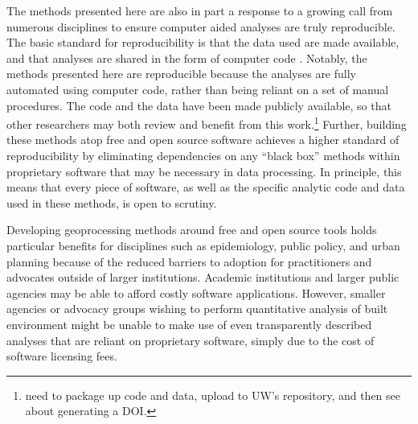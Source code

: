 \documentclass[11pt,letterpaper]{article} %
\begin{document}
The methods presented here are also in part a response to a growing
call from numerous disciplines to ensure computer aided
analyses are truly reproducible. The basic standard for reproducibility is
that the data used are made available, and that analyses are shared in the
form of computer code \parencite{Peng2011computational}. Notably, the
methods presented here are reproducible because the analyses are fully
automated using computer code, rather than being reliant on a set of
manual procedures. The code and the data have been made publicly
available, so that other researchers may both review and benefit from this work.\footnote{need to package up code and data, upload to UW's
  repository, and then see about generating a DOI.}  Further, building
these methods atop free and open source software achieves a higher
standard of reproducibility by eliminating dependencies on any ``black
box'' methods within proprietary software that may be necessary in data processing. In principle, this means that every piece of
software, as well as the specific analytic code and data used in these methods, is open to scrutiny.

Developing geoprocessing methods around free and open source tools
holds particular benefits for disciplines such as epidemiology, public
policy, and urban planning because of the reduced barriers to adoption
for practitioners and advocates outside of larger institutions. Academic
institutions and larger public agencies may be able to afford costly software
applications. However, smaller agencies or advocacy groups wishing to
perform quantitative analysis of built environment might be unable to
make use of even transparently described analyses that are reliant on proprietary software, simply due to the
cost of software licensing fees.
\end{document}
